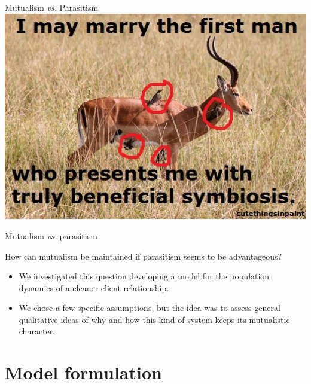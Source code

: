 \documentclass{beamer}
\begin{document}
\begin{frame}{Mutualism \emph{vs.} Parasitism}
        \includegraphics[width=1\textwidth]{marryme.jpg} \\
\end{frame}

\begin{frame}{Mutualism \emph{vs.} parasitism}
    \begin{block}{
        How can mutualism be maintained if parasitism seems to be advantageous?}
\begin{itemize}
    \item We investigated this question developing a model for the population
        dynamics of a cleaner-client relationship.
    \item We chose a few specific assumptions, but the idea was to assess
        general qualitative ideas of why and how this kind of system keeps its
        mutualistic character.
\end{itemize}
\end{block}
\end{frame}


\section{Model formulation}
\end{document}

